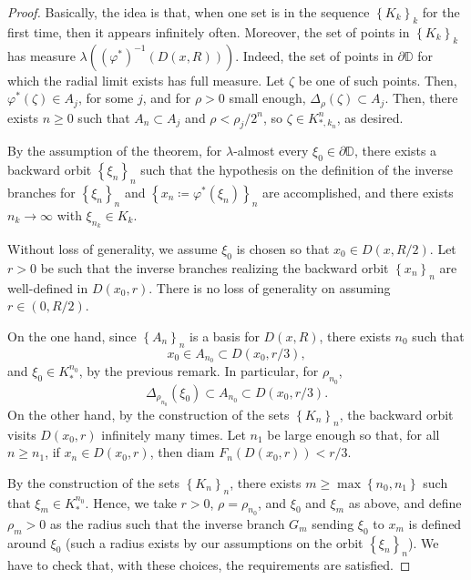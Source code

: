 \documentclass[11pt]{article}
\theoremstyle{definition}
\theoremstyle{remark}
\theoremstyle{plain}
\begin{document}
\begin{proof}
 Basically, the idea is that, when one set is in the sequence $ \left\lbrace K_k\right\rbrace _k $ for the first time, then it appears infinitely often. Moreover, the set of points in $ \left\lbrace K_k\right\rbrace _k $ has  measure $ \lambda ((\varphi^*)^{-1}(D(x,R))) $. Indeed, the set of points in $ \partial\mathbb{D} $ for which the radial limit exists has full measure. Let $ \zeta $ be one of such points. Then, $ \varphi^*(\zeta) \in A_j$, for some $ j $, and for $ \rho>0 $ small enough, $ \Delta_\rho (\zeta)\subset A_j $. Then, there exists $ n\geq 0 $ such that $ A_n\subset A_j $ and $ \rho<\rho_j/2^n $, so $ \zeta \in K^n_{*, k_n}$, as desired.

By the assumption of the theorem, for $ \lambda $-almost every $ \xi_0\in\partial\mathbb{D} $, 
there exists a backward orbit $ \left\lbrace \xi_n\right\rbrace _n $ such that  the hypothesis on the definition of the inverse branches for $ \left\lbrace \xi_n\right\rbrace _n $ and $ \left\lbrace x_n\coloneqq \varphi^*(\xi_n)\right\rbrace _n $ are accomplished, and there exists $ n_k\to \infty  $ with $ \xi_{n_k}\in K_k $. 

Without loss of generality, we assume $ \xi_0 $ is chosen so that $ x_0\in D(x, R/2) $. Let $ r>0 $ be such that the inverse branches realizing the backward orbit $ \left\lbrace x_n\right\rbrace _n $ are well-defined in $ D(x_0,r) $. There is no loss of generality on assuming $ r\in (0, R/2) $. 

On the one hand, since $ \left\lbrace A_n \right\rbrace _n$ is a basis for $ D(x,R) $, there exists $ n_0 $ such that $$ x_0\in A_{n_0}\subset D(x_0, r/3) , $$ and  $ \xi_0 \in K^{n_0}_*$,  by the previous remark. In particular, for $ \rho_{n_0} $,  
\[\Delta_{\rho_{n_0}}(\xi_0)\subset A_{n_0}\subset D(x_0, r/3).\]
On the other hand, 
by the construction of the sets $ \left\lbrace K_n\right\rbrace _n  $, the backward orbit visits $ D(x_0,r) $ infinitely many times. Let $ n_1 $ be large enough so that, for all $ n\geq n_1 $, if $ x_n\in D(x_0, r) $, then $ \textrm{diam }F_n(D(x_0, r))<r/3  $. 

 By the construction of the sets $ \left\lbrace K_n\right\rbrace _n  $, there exists $ m\geq \max \left\lbrace n_0,  n_1\right\rbrace  $ such that $ \xi_m \in K^{n_0}_*$. Hence, we  take $ r>0 $, $ \rho=\rho_{n_0} $, and $ \xi_0 $ and $ \xi_m $ as above, and define $ \rho_m>0 $ as the radius such that the inverse branch $ G_m $ sending $ \xi_0 $ to $ x_m $ is defined around $ \xi_0 $ (such a radius exists by our assumptions on the orbit $ \left\lbrace \xi_n\right\rbrace _n $). We have to check that, with these choices, the requirements are satisfied. 
 


\end{proof}
\end{document}
